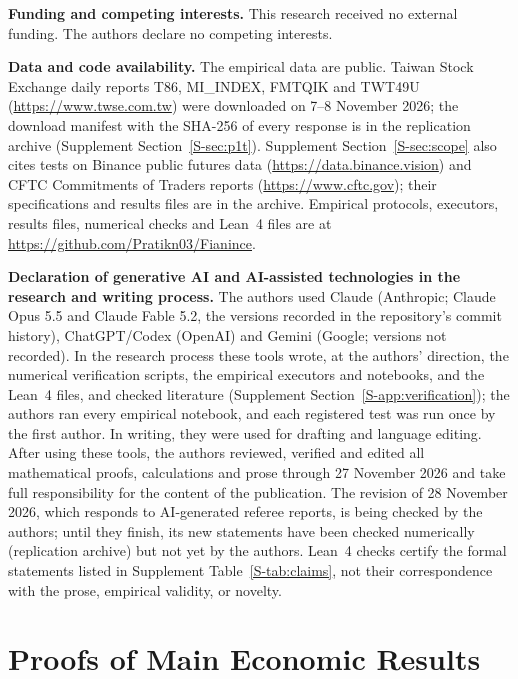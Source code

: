 \documentclass[11pt,letterpaper]{article}
\theoremstyle{definition}
\begin{document}
\textbf{Funding and competing interests.} This research received no external funding. The authors declare no competing interests.

\textbf{Data and code availability.} The empirical data are public. Taiwan Stock Exchange daily reports T86, MI\_INDEX, FMTQIK and TWT49U (\url{https://www.twse.com.tw}) were downloaded on 7--8 November 2026; the download manifest with the SHA-256 of every response is in the replication archive (Supplement Section~\ref{S-sec:p1t}). Supplement Section~\ref{S-sec:scope} also cites tests on Binance public futures data (\url{https://data.binance.vision}) and CFTC Commitments of Traders reports (\url{https://www.cftc.gov}); their specifications and results files are in the archive. Empirical protocols, executors, results files, numerical checks and Lean~4 files are at \url{https://github.com/Pratikn03/Fianince}.

\textbf{Declaration of generative AI and AI-assisted technologies in the research and writing process.} The authors used Claude (Anthropic; Claude Opus 5.5 and Claude Fable 5.2, the versions recorded in the repository's commit history), ChatGPT/Codex (OpenAI) and Gemini (Google; versions not recorded). In the research process these tools wrote, at the authors' direction, the numerical verification scripts, the empirical executors and notebooks, and the Lean~4 files, and checked literature (Supplement Section~\ref{S-app:verification}); the authors ran every empirical notebook, and each registered test was run once by the first author. In writing, they were used for drafting and language editing. After using these tools, the authors reviewed, verified and edited all mathematical proofs, calculations and prose through 27 November 2026 and take full responsibility for the content of the publication. The revision of 28 November 2026, which responds to AI-generated referee reports, is being checked by the authors; until they finish, its new statements have been checked numerically (replication archive) but not yet by the authors. Lean~4 checks certify the formal statements listed in Supplement Table~\ref{S-tab:claims}, not their correspondence with the prose, empirical validity, or novelty.

\appendix
\small\linespread{0.94}\selectfont
\setlength{\parskip}{1.5pt plus 0.5pt minus 0.5pt}
\setlength{\abovedisplayskip}{2pt plus 1pt minus 1pt}
\setlength{\belowdisplayskip}{2pt plus 1pt minus 1pt}
\setlength{\abovedisplayshortskip}{1pt plus 1pt}
\setlength{\belowdisplayshortskip}{1pt plus 1pt}
\section{Proofs of Main Economic Results}\label{app:proofs}
\end{document}
